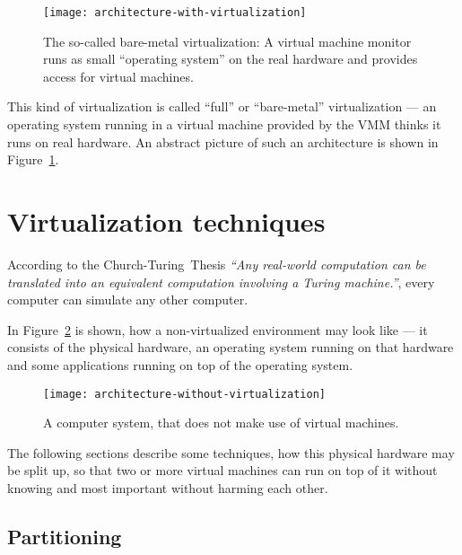 \begin{figure}[htbp]
  \centering
  \texttt{[image: architecture-with-virtualization]}
  \caption[Virtualization     architecture]{The    so-called    bare-metal
    virtualization: A  virtual machine  monitor runs as  small ``operating
    system''  on  the  real  hardware  and  provides  access  for  virtual
    machines.}
  \label{fig:arch-virt}
\end{figure}

This  kind   of  virtualization  is  called   ``full''  or  ``bare-metal''
virtualization  ---  an operating  system  running  in  a virtual  machine
provided by the  VMM thinks it runs on real  hardware. An abstract picture
of such an architecture is shown in Figure~\ref{fig:arch-virt}.

\section{Virtualization techniques}
\label{sec:techniques}

According   to    the   Church-Turing~Thesis   \cite{church_turing_thesis}
\emph{``Any real-world  computation can  be translated into  an equivalent
  computation involving  a Turing machine.''}, every  computer can simulate
any other computer.

\bigskip

In Figure~\ref{fig:arch-novirt} is  shown, how a non-virtualized environment
may  look like  --- it  consists of  the physical  hardware,  an operating
system running  on that hardware and  some applications running  on top of
the operating system.

\begin{figure}[htbp]
  \centering
  \texttt{[image: architecture-without-virtualization]}
  \caption[Architecture  without virtualization]{A  computer  system, that
    does not make use of virtual machines.}
  \label{fig:arch-novirt}
\end{figure}

The  following  sections  describe  some  techniques,  how  this  physical
hardware may be split up, so that  two or more virtual machines can run on
top of it without knowing and most important without harming each other.

\subsection{Partitioning}
\label{sec:vt-partitioning}


